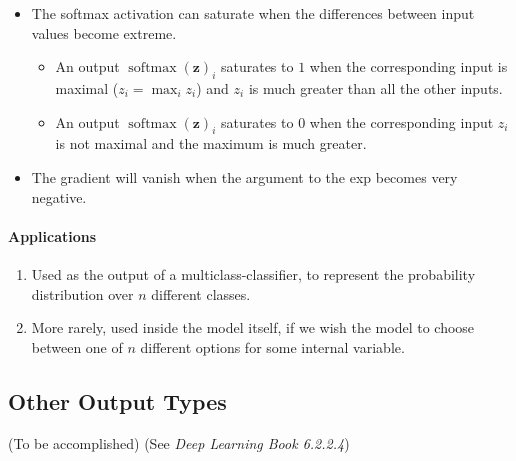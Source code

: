 \documentclass[12pt, a4paper]{article}
\def\vz{\boldsymbol{z}}
\DeclareMathOperator*{\softmax}{softmax}
\begin{document}
\begin{enumerate}
        \begin{itemize}
            \item The softmax activation can saturate when the differences between input values become extreme.
                \begin{itemize}
                    \item An output $\softmax(\vz)_i$ saturates to $1$ when the corresponding input is maximal ($z_i = \max_i z_i$) and $z_i$ is much greater than all the other inputs.
                    \item An output $\softmax(\vz)_i$ saturates to $0$ when the corresponding input $z_i$ is not maximal and the maximum is much greater.
                \end{itemize}
            \item The gradient will vanish when the argument to the exp becomes very negative.
        \end{itemize}
\end{enumerate}
\paragraph{Applications}
\begin{enumerate}
    \item Used as the output of a multiclass-classifier, to represent the probability distribution over $n$ different classes.
    \item More rarely, used inside the model itself, if we wish the model to choose between one of $n$ different options for some internal variable.
\end{enumerate}


\subsection{Other Output Types}
(To be accomplished) (See \textit{Deep Learning Book 6.2.2.4})
\end{document}
